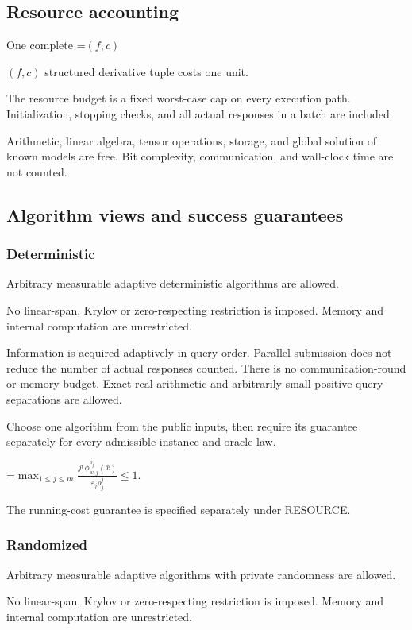 \documentclass[10pt,a4paper]{article}
\newcommand{\AtlasMath}[1]{\par\begingroup\centering\setbox0=\hbox{$\displaystyle #1$}\ifdim\wd0>1.4\linewidth\typeout{ATLAS WIDE FORMULA: \the\wd0}\fi\ifdim\wd0>\linewidth\resizebox{\linewidth}{!}{\box0}\else\box0\fi\par\endgroup}
\newcommand{\AtlasInlineMath}[1]{\begingroup\setbox0=\hbox{$#1$}\ifdim\wd0>.4\linewidth\endgroup\AtlasMath{#1}\else\endgroup$#1$\fi}
\begin{document}
\subsection{Resource accounting}
One complete \AtlasInlineMath{(f,c)} structured derivative tuple costs one unit.

The resource budget is a fixed worst-case cap on every execution path. Initialization, stopping checks, and all actual responses in a batch are included.

Arithmetic, linear algebra, tensor operations, storage, and global solution of known models are free. Bit complexity, communication, and wall-clock time are not counted.

\subsection{Algorithm views and success guarantees}
\subsubsection{Deterministic}
Arbitrary measurable adaptive deterministic algorithms are allowed.

No linear-span, Krylov or zero-respecting restriction is imposed. Memory and internal computation are unrestricted.

Information is acquired adaptively in query order. Parallel submission does not reduce the number of actual responses counted. There is no communication-round or memory budget. Exact real arithmetic and arbitrarily small positive query separations are allowed.

Choose one algorithm from the public inputs, then require its guarantee separately for every admissible instance and oracle law.


\AtlasMath{\max_{1\le j\le m}\frac{j!\,\phi_{w,j}^{\rho_j}(\widehat{x})}{\varepsilon_j\rho_j^j}\le 1.}


The running-cost guarantee is specified separately under RESOURCE.

\subsubsection{Randomized}
Arbitrary measurable adaptive algorithms with private randomness are allowed.

No linear-span, Krylov or zero-respecting restriction is imposed. Memory and internal computation are unrestricted.
\end{document}
